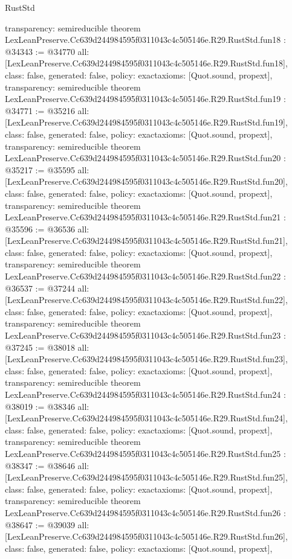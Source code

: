 \begin{lexlean}{RustStd}
\begin{coremodule}
{  transparency: semireducible
}
theorem LexLeanPreserve.Cc639d244984595f0311043c4c505146e.R29.RustStd.fun18 : @34343 := @34770 {
  all: [LexLeanPreserve.Cc639d244984595f0311043c4c505146e.R29.RustStd.fun18],
  class: false,
  generated: false,
  policy: exact{axioms: [Quot.sound, propext]},
  transparency: semireducible
}
theorem LexLeanPreserve.Cc639d244984595f0311043c4c505146e.R29.RustStd.fun19 : @34771 := @35216 {
  all: [LexLeanPreserve.Cc639d244984595f0311043c4c505146e.R29.RustStd.fun19],
  class: false,
  generated: false,
  policy: exact{axioms: [Quot.sound, propext]},
  transparency: semireducible
}
theorem LexLeanPreserve.Cc639d244984595f0311043c4c505146e.R29.RustStd.fun20 : @35217 := @35595 {
  all: [LexLeanPreserve.Cc639d244984595f0311043c4c505146e.R29.RustStd.fun20],
  class: false,
  generated: false,
  policy: exact{axioms: [Quot.sound, propext]},
  transparency: semireducible
}
theorem LexLeanPreserve.Cc639d244984595f0311043c4c505146e.R29.RustStd.fun21 : @35596 := @36536 {
  all: [LexLeanPreserve.Cc639d244984595f0311043c4c505146e.R29.RustStd.fun21],
  class: false,
  generated: false,
  policy: exact{axioms: [Quot.sound, propext]},
  transparency: semireducible
}
theorem LexLeanPreserve.Cc639d244984595f0311043c4c505146e.R29.RustStd.fun22 : @36537 := @37244 {
  all: [LexLeanPreserve.Cc639d244984595f0311043c4c505146e.R29.RustStd.fun22],
  class: false,
  generated: false,
  policy: exact{axioms: [Quot.sound, propext]},
  transparency: semireducible
}
theorem LexLeanPreserve.Cc639d244984595f0311043c4c505146e.R29.RustStd.fun23 : @37245 := @38018 {
  all: [LexLeanPreserve.Cc639d244984595f0311043c4c505146e.R29.RustStd.fun23],
  class: false,
  generated: false,
  policy: exact{axioms: [Quot.sound, propext]},
  transparency: semireducible
}
theorem LexLeanPreserve.Cc639d244984595f0311043c4c505146e.R29.RustStd.fun24 : @38019 := @38346 {
  all: [LexLeanPreserve.Cc639d244984595f0311043c4c505146e.R29.RustStd.fun24],
  class: false,
  generated: false,
  policy: exact{axioms: [Quot.sound, propext]},
  transparency: semireducible
}
theorem LexLeanPreserve.Cc639d244984595f0311043c4c505146e.R29.RustStd.fun25 : @38347 := @38646 {
  all: [LexLeanPreserve.Cc639d244984595f0311043c4c505146e.R29.RustStd.fun25],
  class: false,
  generated: false,
  policy: exact{axioms: [Quot.sound, propext]},
  transparency: semireducible
}
theorem LexLeanPreserve.Cc639d244984595f0311043c4c505146e.R29.RustStd.fun26 : @38647 := @39039 {
  all: [LexLeanPreserve.Cc639d244984595f0311043c4c505146e.R29.RustStd.fun26],
  class: false,
  generated: false,
  policy: exact{axioms: [Quot.sound, propext]},
}
\end{coremodule}
\end{lexlean}
